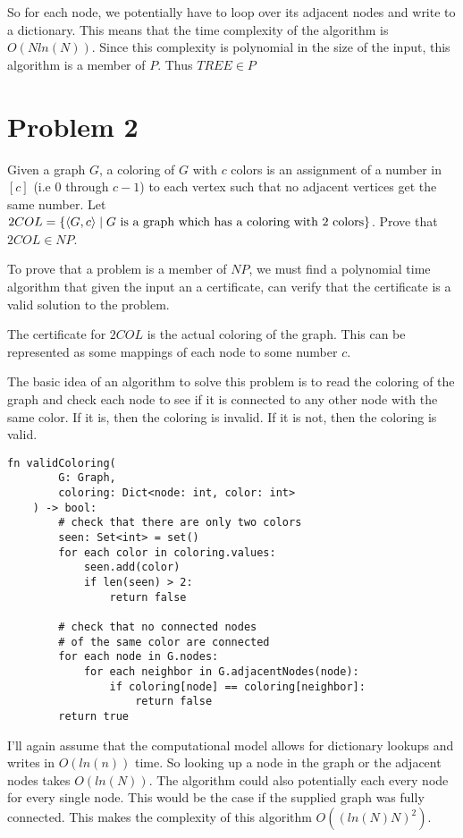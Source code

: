 \documentclass[12pt]{article}
\begin{document}
So for each node, we potentially have to loop over its adjacent nodes and write to a dictionary. This means that the time complexity of the algorithm is $O(Nln(N))$. Since this complexity is polynomial in the size of the input, this algorithm is a member of $P$. Thus $TREE \in P$

\section*{Problem 2}

\begin{questionbox}
	Given a graph $G$, a coloring of $G$ with $c$ colors is an assignment of a number in $[c]$ (i.e 0 through $c-1$) to each vertex such that no adjacent vertices get the same number. Let $2COL = \{ \braket{G, c} \mid G \text{ is a graph which has a coloring with 2 colors} \}$. Prove that $2COL \in NP$.
\end{questionbox}

To prove that a problem is a member of $NP$, we must find a polynomial time algorithm that given the input an a certificate, can verify that the certificate is a valid solution to the problem.

The certificate for $2COL$ is the actual coloring of the graph. This can be represented as some mappings of each node to some number $c$.

The basic idea of an algorithm to solve this problem is to read the coloring of the graph and check each node to see if it is connected to any other node with the same color. If it is, then the coloring is invalid. If it is not, then the coloring is valid.

\begin{lstlisting}[basicstyle=\small, tabsize=3]
	fn validColoring(
		G: Graph,
		coloring: Dict<node: int, color: int>
	) -> bool:
		# check that there are only two colors
		seen: Set<int> = set()
		for each color in coloring.values:
			seen.add(color)
			if len(seen) > 2:
				return false

		# check that no connected nodes
		# of the same color are connected
		for each node in G.nodes:
			for each neighbor in G.adjacentNodes(node):
				if coloring[node] == coloring[neighbor]:
					return false
		return true
\end{lstlisting}


I'll again assume that the computational model allows for dictionary lookups and writes in $O(ln(n))$ time. So looking up a node in the graph or the adjacent nodes takes $O(ln(N))$. The algorithm could also potentially each every node for every single node. This would be the case if the supplied graph was fully connected. This makes the complexity of this algorithm $O((ln(N)N)^2)$.
\end{document}

